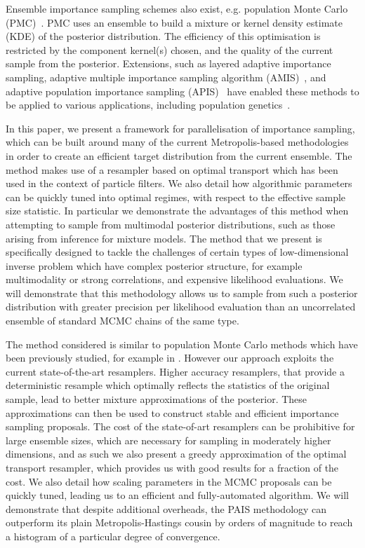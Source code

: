 \documentclass[final]{siamltex}
\begin{document}
Ensemble importance sampling schemes also exist, e.g. population Monte Carlo (PMC)~\cite{cappe2012population}. PMC uses an ensemble to build a mixture or kernel density estimate (KDE) of the
posterior distribution. The efficiency of
this optimisation is restricted by the component kernel(s) chosen, and
the quality of the current sample from the posterior\cite{cappe2008adaptive,douc2007convergence,douc2007minimum}. Extensions, such
as layered adaptive importance sampling\cite{martino2017layered}, adaptive multiple importance sampling algorithm
(AMIS)~\cite{cornuet2012adaptive}, and adaptive population importance sampling
(APIS)~\cite{martino2015adaptive} have enabled these methods to be
applied to various applications, including population
genetics~\cite{siren2011reconstructing}.

In this paper, we present a framework for parallelisation of
importance sampling, which can be built around many of the current
Metropolis-based methodologies in order to create an efficient target
distribution from the current
ensemble. The method makes use of a resampler based on optimal
transport which has been used in the context of particle
filters\cite{reich2013nonparametric}. We also detail how algorithmic
parameters can be quickly tuned into optimal regimes, with respect to
the effective sample size statistic. In particular we demonstrate the
advantages of this method when attempting to sample from multimodal
posterior distributions, such as those arising from inference for
mixture models. The method that we present is specifically designed to
tackle the challenges of certain types of low-dimensional inverse
problem which have complex posterior structure, for example
multimodality or strong correlations, and expensive
likelihood evaluations. We will demonstrate that this methodology
allows us to sample from such a posterior distribution with greater
precision per likelihood evaluation than an uncorrelated ensemble of
standard MCMC chains of the same type.

The method considered is similar to population Monte Carlo methods
which have been previously studied, for example in
\cite{elvira2017improving}. However our approach exploits the current
state-of-the-art resamplers. Higher accuracy resamplers, that provide
a deterministic resample which optimally reflects the statistics of
the original sample, lead to better mixture approximations of the
posterior. These approximations can then be used to construct stable
and efficient importance sampling proposals. The cost of the
state-of-art resamplers can be prohibitive for large ensemble sizes,
which are necessary for sampling in moderately higher dimensions, and
as such we also present a greedy approximation of the optimal
transport resampler, which provides us with good results for a
fraction of the cost. We also detail how scaling parameters in the
MCMC proposals can be quickly tuned, leading us to an efficient and
fully-automated algorithm. We will demonstrate that despite additional
overheads, the PAIS methodology can outperform its plain
Metropolis-Hastings cousin by orders of magnitude to reach a histogram
of a particular degree of convergence.
\end{document}
